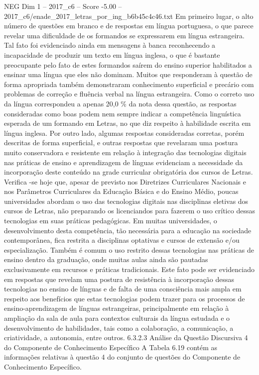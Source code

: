 \begin{textsample}{NEG Dim 1 – 2017\_c6 – Score -5.00 – 2017\_c6/enade\_2017\_letras\_por\_ing\_b6b45c4c46.txt}
Em primeiro lugar, o alto número de questões em branco e de respostas em língua portuguesa, o que parece revelar uma dificuldade de os formandos se expressarem em língua estrangeira.
Tal fato foi evidenciado ainda em mensagens à banca reconhecendo a incapacidade de produzir um texto em língua inglesa, o que é bastante preocupante pelo fato de estes formandos saírem do ensino superior habilitados a ensinar uma língua que eles não dominam.
Muitos que responderam à questão de forma apropriada também demonstraram conhecimento superficial e precário com problemas de correção e fluência verbal na língua estrangeira.
Como o correto uso da língua correspondeu a apenas 20,0 \% da nota dessa questão, as respostas consideradas como boas podem nem sempre indicar a competência linguística esperada de um formando em Letras, no que diz respeito à habilidade escrita em língua inglesa.
Por outro lado, algumas respostas consideradas corretas, porém descritas de forma superficial, e outras respostas que revelaram uma postura muito conservadora e resistente em relação à integração das tecnologias digitais nas práticas de ensino e aprendizagem de línguas evidenciam a necessidade da incorporação deste conteúdo na grade curricular obrigatória dos cursos de Letras.
Verifica -se hoje que, apesar de previsto nos Diretrizes Curriculares Nacionais e nos Parâmetros Curriculares da Educação Básica e do Ensino Médio, poucas universidades abordam o uso das tecnologias digitais nas disciplinas eletivas dos cursos de Letras, não preparando os licenciandos para fazerem o uso crítico dessas tecnologias em suas práticas pedagógicas.
Em muitas universidades, o desenvolvimento desta competência, tão necessária para a educação na sociedade contemporânea, fica restrita a disciplinas optativas e cursos de extensão e/ou especialização.
Também é comum o uso restrito dessas tecnologias nas práticas de ensino dentro da graduação, onde muitas aulas ainda são pautadas exclusivamente em recursos e práticas tradicionais.
Este fato pode ser evidenciado em respostas que revelam uma postura de resistência à incorporação dessas tecnologias no ensino de línguas e de falta de uma consciência mais ampla em respeito aos benefícios que estas tecnologias podem trazer para os processos de ensino-aprendizagem de línguas estrangeiras, principalmente em relação à ampliação da sala de aula para contextos culturais da língua estudada e o desenvolvimento de habilidades, tais como a colaboração, a comunicação, a criatividade, a autonomia, entre outros. 6.3.2.3 Análise da Questão Discursiva 4 do Componente de Conhecimento Específico A Tabela 6.19 contém as informações relativas à questão 4 do conjunto de questões do Componente de Conhecimento Específico.

\end{textsample}

